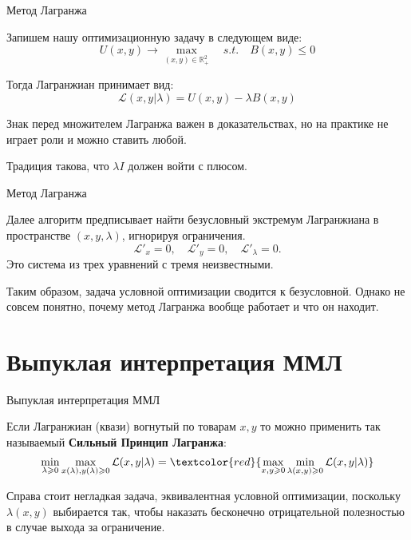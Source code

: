 \documentclass{beamer}
\begin{document}
\begin{frame}{Метод Лагранжа}

Запишем нашу оптимизационную задачу в следующем виде:
$$ U(x, y) \to \max_{(x,y) \in \mathbb{R}^2_{+}} \quad s.t.\quad  B(x,y) \leqslant 0$$

Тогда Лагранжиан принимает вид:
$$ \mathcal{L}(x, y | \lambda) = U(x,y) - \lambda B(x,y)$$

Знак перед множителем Лагранжа важен в доказательствах, но на практике не играет роли и можно ставить любой.

Традиция такова, что $\lambda I$ должен войти с плюсом.

\end{frame}

\begin{frame}{Метод Лагранжа}

Далее алгоритм предписывает найти безусловный экстремум Лагранжиана в пространстве $(x, y, \lambda)$, игнорируя ограничения.
$$ \mathcal{L}'_x = 0, \quad \mathcal{L}'_y = 0, \quad \mathcal{L}'_{\lambda} = 0.$$
Это система из трех уравнений с тремя неизвестными.

Таким образом, задача условной оптимизации сводится к безусловной. Однако не совсем понятно, почему метод Лагранжа вообще работает и что он находит.

\end{frame}

\section{Выпуклая интерпретация ММЛ}

\begin{frame}{Выпуклая интерпретация ММЛ}

Если Лагранжиан (квази) вогнутый по товарам $x,y$ то можно применить так называемый \textbf{Сильный Принцип Лагранжа}:
$$ \min_{\lambda \geqslant 0} \max_{x(\lambda),y(\lambda) \geqslant 0} \mathcal{L}(x,y | \lambda) = \textcolor{red}{\max_{x,y \geqslant 0} \min_{\lambda(x,y) \geqslant 0} \mathcal{L}(x,y | \lambda)} $$ 

Справа стоит негладкая задача, эквивалентная условной оптимизации, поскольку $\lambda(x,y)$ выбирается так, чтобы наказать бесконечно отрицательной полезностью в случае выхода за ограничение.

\end{frame}
\end{document}
